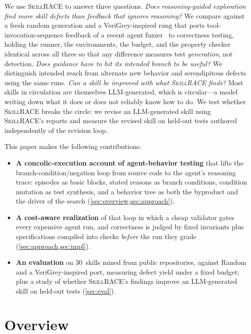 \documentclass[acmsmall,screen,review,anonymous]{acmart}
\newcommand{\tool}{\textsc{SkillRACE}\xspace}
\newcommand{\NumSkills}{30}                  %
\begin{document}
We use \tool to answer three questions. \emph{Does reasoning-guided exploration find
more skill defects than feedback that ignores reasoning?} We compare against a
fresh random generation and a VeriGrey-inspired rung that ports tool-invocation-sequence
feedback of a recent agent fuzzer~\cite{verigrey} to correctness testing, holding the
runner, the environments, the budget, and the property checker identical across all
three so that any difference measures test \emph{generation}, not detection.
\emph{Does guidance have to hit its intended branch to be useful?} We distinguish
intended reach from alternate new behavior and serendipitous defects using the same runs.
\emph{Can a skill be improved with what \tool finds?} Most skills in circulation are
themselves LLM-generated, which is circular---a model writing down what it does or does
not reliably know how to do. We test whether \tool breaks the circle: we revise an
LLM-generated skill using \tool's reports and measure the revised skill on held-out
tests authored independently of the revision loop.

\smallskip\noindent This paper makes the following contributions:
\begin{itemize}[itemsep=2pt,topsep=2pt]
  \item \textbf{A concolic-execution account of agent-behavior testing} that lifts the
  branch-condition/negation loop from source code to the agent's reasoning trace:
  episodes as basic blocks, stated reasons as branch conditions, condition mutation as
  test synthesis, and a behavior tree as both the byproduct and the driver of the
  search (\cref{sec:overview,sec:approach}).
  \item \textbf{A cost-aware realization} of that loop in which a cheap validator gates
  every expensive agent run, and correctness is judged by fixed invariants plus
  specifications compiled into checks \emph{before} the run they grade
  (\cref{sec:approach,sec:impl}).
  \item \textbf{An evaluation} on \NumSkills\ skills mined from public repositories,
  against Random and a VeriGrey-inspired port, measuring defect yield
  under a fixed budget; plus a study of whether \tool's findings improve an
  LLM-generated skill on held-out tests (\cref{sec:eval}).
\end{itemize}

\section{Overview}
\label{sec:overview}
\end{document}
